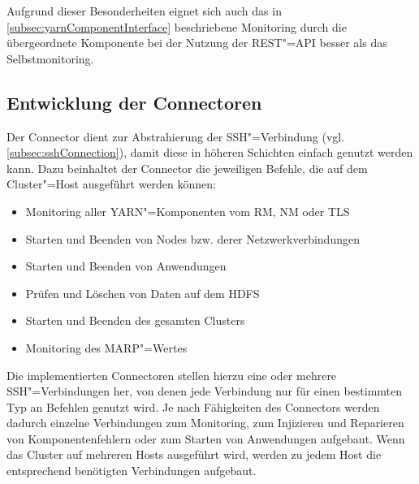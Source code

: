 Aufgrund dieser Besonderheiten eignet sich auch das in \cref{subsec:yarnComponentInterface} beschriebene Monitoring durch die übergeordnete Komponente bei der Nutzung der REST"=API besser als das Selbstmonitoring.

\subsection{Entwicklung der Connectoren}
\label{subsec:implementedConnectors}

Der Connector dient zur Abstrahierung der SSH"=Verbindung (vgl. \cref{subsec:sshConnection}), damit diese in höheren Schichten einfach genutzt werden kann.
Dazu beinhaltet der Connector die jeweiligen Befehle, die auf dem Cluster"=Host ausgeführt werden können:

\begin{itemize}
    \item Monitoring aller YARN"=Komponenten vom \gls{RM}, \gls{NM} oder \gls{TLS}
    \item Starten und Beenden von Nodes bzw. derer Netzwerkverbindungen
    \item Starten und Beenden von Anwendungen
    \item Prüfen und Löschen von Daten auf dem HDFS
    \item Starten und Beenden des gesamten Clusters
    \item Monitoring des \gls{MARP}"=Wertes
\end{itemize}

Die implementierten Connectoren stellen hierzu eine oder mehrere SSH"=Verbindungen her, von denen jede Verbindung nur für einen bestimmten Typ an Befehlen genutzt wird.
Je nach Fähigkeiten des Connectors werden dadurch einzelne Verbindungen zum Monitoring, zum Injizieren und Reparieren von Komponentenfehlern oder zum Starten von Anwendungen aufgebaut.
Wenn das Cluster auf mehreren Hosts ausgeführt wird, werden zu jedem Host die entsprechend benötigten Verbindungen aufgebaut.

